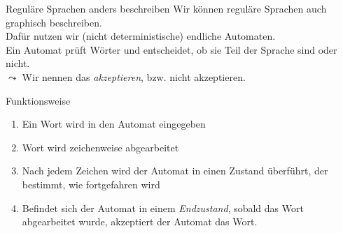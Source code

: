 %
%
%
%

\begin{frame}[fragile]{Reguläre Sprachen anders beschreiben}
    Wir können reguläre Sprachen auch graphisch beschreiben.\\
    Dafür nutzen wir \alert{(nicht deterministische) endliche Automaten}.\\
    Ein Automat prüft Wörter und entscheidet, ob sie Teil der Sprache sind oder nicht.\\
    $\leadsto$ Wir nennen das \alert{\emph{akzeptieren}}, bzw. nicht akzeptieren.
    \begin{alertblock}{Funktionsweise}
        \begin{enumerate}
            \item Ein Wort wird in den Automat eingegeben
            \item Wort wird zeichenweise abgearbeitet
            \item Nach jedem Zeichen wird der Automat in einen Zustand überführt, der bestimmt, wie fortgefahren wird
            \item Befindet sich der Automat in einem \emph{Endzustand}, sobald das Wort abgearbeitet wurde, akzeptiert der Automat das Wort.
        \end{enumerate}
    \end{alertblock}
\end{frame}

